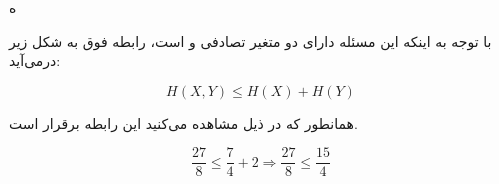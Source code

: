 \SubProblem
{ه}
{
    با توجه به اینکه این مسئله دارای دو متغیر تصادفی 
    و
    است، رابطه فوق به شکل زیر درمی‌آید:
    
    \begin{equation*}
        H(X, Y) \leq H(X) + H(Y)
    \end{equation*}
    
    همانطور که در ذیل مشاهده می‌کنید این رابطه برقرار است.
    
    \begin{equation*}
        \frac{27}{8} \le \frac{7}{4} + 2 \Rightarrow \frac{27}{8} \le \frac{15}{4}
    \end{equation*}
}